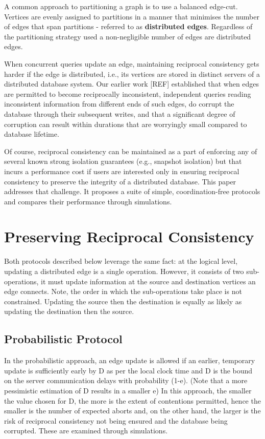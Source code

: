 \documentclass[sigplan,screen]{acmart}
\begin{document}
A common approach to partitioning a graph is to use a balanced edge-cut. Vertices are evenly assigned to partitions in a manner that minimises the number of edges that span partitions - referred to as \textbf{distributed edges}. Regardless of the partitioning strategy used a non-negligible number of edges are distributed edges.

When concurrent queries update an edge, maintaining reciprocal consistency gets harder if the edge is distributed, i.e., its vertices are stored in distinct servers of a distributed database system. Our earlier work [REF] established that when edges are permitted to become reciprocally inconsistent, independent queries reading inconsistent information from different ends of such edges, do corrupt the database through their subsequent writes, and that a significant degree of corruption can result within durations that are worryingly small compared to database lifetime.

Of course, reciprocal consistency can be maintained as a part of enforcing any of several known strong isolation guarantees (e.g., snapshot isolation) but that incurs a performance cost if users are interested only in ensuring reciprocal consistency to preserve the integrity of a distributed database. This paper addresses that
challenge. It proposes a suite of simple, coordination-free protocols and compares their performance through simulations.



\section{Preserving Reciprocal Consistency}

Both protocols described below leverage the same fact: at the logical level, updating a distributed edge is a single operation. However, it consists of two sub-operations, it must update information at the source and destination vertices an edge connects. Note, the order in which the sub-operations take place is not constrained. Updating the source then the destination is equally as likely as updating the destination then the source.

\subsection{Probabilistic Protocol}

In the probabilistic approach, an edge update is allowed if an earlier, temporary update is sufficiently early by D as per the local clock time and D is the bound on the server communication delays with probability (1-e). (Note that a more pessimistic estimation of D results in a smaller e) In this approach, the smaller the value chosen for D, the more is the extent of contentions permitted, hence the smaller is the number of expected aborts and, on the other hand, the larger is the risk of reciprocal consistency not being ensured and the database being corrupted. These are examined through simulations.
\end{document}
